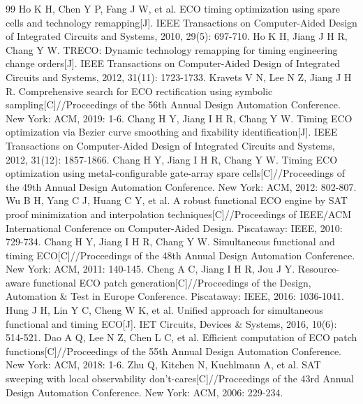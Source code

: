 \documentclass[twocolumn,10pt,fontset=windows]{ctexart}
\begin{document}
\clearpage
\twocolumn
\renewcommand{\refname}{参考文献}
\footnotesize
\begin{thebibliography}{99}
 Ho K H, Chen Y P, Fang J W, et al. ECO timing optimization using spare cells and technology remapping[J]. IEEE Transactions on Computer-Aided Design of Integrated Circuits and Systems, 2010, 29(5): 697-710.
 Ho K H, Jiang J H R, Chang Y W. TRECO: Dynamic technology remapping for timing engineering change orders[J]. IEEE Transactions on Computer-Aided Design of Integrated Circuits and Systems, 2012, 31(11): 1723-1733.
 Kravets V N, Lee N Z, Jiang J H R. Comprehensive search for ECO rectification using symbolic sampling[C]//Proceedings of the 56th Annual Design Automation Conference. New York: ACM, 2019: 1-6.
 Chang H Y, Jiang I H R, Chang Y W. Timing ECO optimization via Bezier curve smoothing and fixability identification[J]. IEEE Transactions on Computer-Aided Design of Integrated Circuits and Systems, 2012, 31(12): 1857-1866.
 Chang H Y, Jiang I H R, Chang Y W. Timing ECO optimization using metal-configurable gate-array spare cells[C]//Proceedings of the 49th Annual Design Automation Conference. New York: ACM, 2012: 802-807.
 Wu B H, Yang C J, Huang C Y, et al. A robust functional ECO engine by SAT proof minimization and interpolation techniques[C]//Proceedings of IEEE/ACM International Conference on Computer-Aided Design. Piscataway: IEEE, 2010: 729-734.
 Chang H Y, Jiang I H R, Chang Y W. Simultaneous functional and timing ECO[C]//Proceedings of the 48th Annual Design Automation Conference. New York: ACM, 2011: 140-145.
 Cheng A C, Jiang I H R, Jou J Y. Resource-aware functional ECO patch generation[C]//Proceedings of the Design, Automation \& Test in Europe Conference. Piscataway: IEEE, 2016: 1036-1041.
 Hung J H, Lin Y C, Cheng W K, et al. Unified approach for simultaneous functional and timing ECO[J]. IET Circuits, Devices \& Systems, 2016, 10(6): 514-521.
 Dao A Q, Lee N Z, Chen L C, et al. Efficient computation of ECO patch functions[C]//Proceedings of the 55th Annual Design Automation Conference. New York: ACM, 2018: 1-6.
 Zhu Q, Kitchen N, Kuehlmann A, et al. SAT sweeping with local observability don't-cares[C]//Proceedings of the 43rd Annual Design Automation Conference. New York: ACM, 2006: 229-234.

\end{thebibliography}
\end{document}
